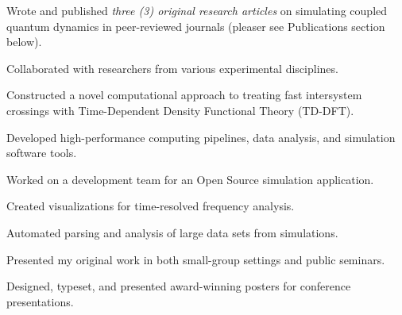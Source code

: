 \documentclass[letterpaper]{deedy-resume} %
\begin{document}
\begin{minipage}[t]{0.65\textwidth}
\begin{tightitemize}
\item Wrote and published \textit{three (3) original research articles} on simulating coupled quantum dynamics in peer-reviewed journals (pleaser see Publications section below).
\item Collaborated with researchers from various experimental disciplines. 
\item Constructed a novel computational approach to treating fast intersystem crossings with Time-Dependent Density Functional Theory (TD-DFT).
\item Developed high-performance computing pipelines, data analysis, and simulation software tools. 
\item Worked on a development team for an Open Source simulation application. 
\item Created visualizations for time-resolved frequency analysis.
\item Automated parsing and analysis of large data sets from simulations.
\item Presented my original work in both small-group settings and public seminars.
\item Designed, typeset, and presented award-winning posters for conference presentations. 

\end{tightitemize}
\sectionspace %



\end{minipage}
\end{document}
